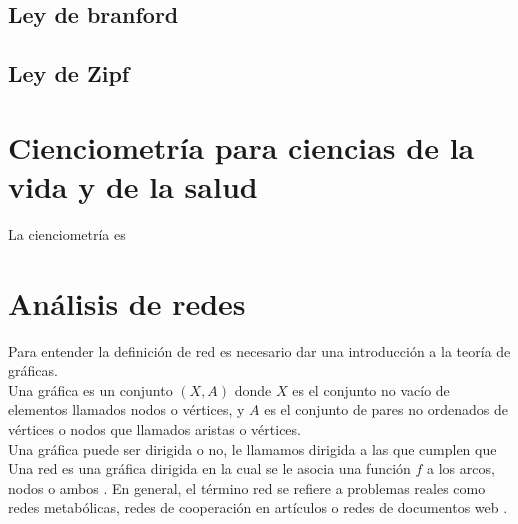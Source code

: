 \documentclass[../Main.tex]{subfiles}
\begin{document}
\subsection{Ley de branford }
\noindent
\subsection{Ley de Zipf}
\noindent

\section{Cienciometría para ciencias de la vida y de la salud}
\noindent
La cienciometría es  

\section{Análisis de redes}
\noindent
Para entender la definición de red es necesario dar una introducción a la teoría de gráficas.\\
Una gráfica es un conjunto $(X,A)$ donde $X$ es el conjunto no vacío de elementos llamados nodos o vértices, y $A$ es el conjunto de pares no ordenados de vértices o nodos que llamados aristas o vértices.\\
Una gráfica puede ser dirigida o no, le llamamos dirigida a las que cumplen que  \\

Una red es una gráfica dirigida en la cual se le asocia una función $f$ a los arcos, nodos o ambos \parencite{hernandez_redes}. En general, el término red se refiere a problemas reales como redes metabólicas, redes de cooperación en artículos o redes de documentos web \parencite{barabasi_network_2016}.
\end{document}
